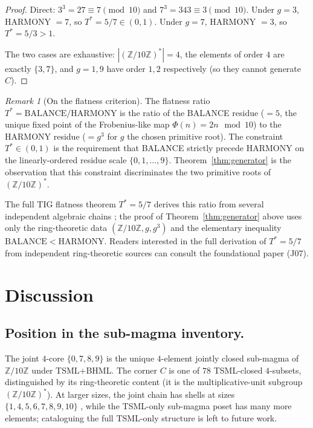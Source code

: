 \documentclass[11pt,reqno]{amsart}
\theoremstyle{plain}
\theoremstyle{definition}
\theoremstyle{remark}
\newtheorem*{remark}{Remark}
\newcommand{\Z}{\mathbb{Z}}
\begin{document}
\begin{proof}
Direct: $3^3 = 27 \equiv 7 \pmod{10}$ and $7^3 = 343 \equiv 3 \pmod
{10}$.  Under $g = 3$, HARMONY $= 7$, so $T^* = 5/7 \in (0, 1)$.
Under $g = 7$, HARMONY $= 3$, so $T^* = 5/3 > 1$.

The two cases are exhaustive: $|(\Z/10\Z)^*| = 4$, the elements of
order $4$ are exactly $\{3, 7\}$, and $g = 1, 9$ have order $1, 2$
respectively (so they cannot generate $C$).
\end{proof}

\begin{remark}[On the flatness criterion]\label{rem:flatness}
The flatness ratio $T^* = \mathrm{BALANCE}/\mathrm{HARMONY}$ is the
ratio of the BALANCE residue ($= 5$, the unique fixed point of the
Frobenius-like map $\Phi(n) = 2n \mod 10$) to the HARMONY residue
($= g^3$ for $g$ the chosen primitive root).  The constraint
$T^* \in (0, 1)$ is the requirement that BALANCE strictly precede
HARMONY on the linearly-ordered residue scale $\{0, 1, \ldots, 9\}$.
Theorem~\ref{thm:generator} is the observation that this constraint
discriminates the two primitive roots of $(\Z/10\Z)^*$.

The full TIG flatness theorem $T^* = 5/7$ derives this ratio from
several independent algebraic chains \cite[D18d]{SandersTIG};
the proof of Theorem~\ref{thm:generator} above uses only the
ring-theoretic data $(\Z/10\Z, g, g^3)$ and the elementary inequality
$\mathrm{BALANCE} < \mathrm{HARMONY}$.  Readers interested in the
full derivation of $T^* = 5/7$ from independent ring-theoretic
sources can consult the foundational paper
\cite[\S 4]{SandersTIG} (J07).
\end{remark}

\section{Discussion}
\label{sec:discussion}

\subsection{Position in the sub-magma inventory.}
The joint $4$-core $\{0, 7, 8, 9\}$ is the unique $4$-element jointly
closed sub-magma of $\Z/10\Z$ under TSML+BHML.  The corner $C$ is one
of $78$ TSML-closed $4$-subsets, distinguished by its ring-theoretic
content (it is the multiplicative-unit subgroup
$(\Z/10\Z)^*$).  At larger sizes, the joint chain has shells at
sizes $\{1, 4, 5, 6, 7, 8, 9, 10\}$
\cite[Theorem 1]{SandersGishFourCore}, while the TSML-only sub-magma
poset has many more elements; cataloguing the full TSML-only structure
is left to future work.
\end{document}
